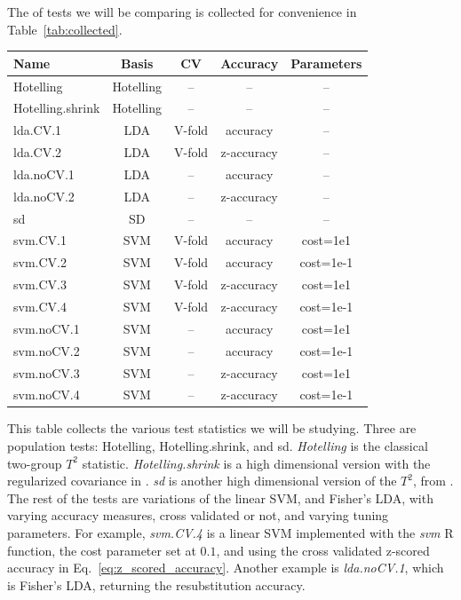 \documentclass[12pt,a4paper]{article}
\theoremstyle{definition}
\newcommand{\R}{\textsf{R }}
\begin{document}
The of tests we will be comparing is collected for convenience in Table~\ref{tab:collected}.
\begin{tcolorbox}
\centering
\begin{tabular}{l|c|c|c|c}
Name & Basis & CV & Accuracy & Parameters\\ 
\hline
\hline
Hotelling & Hotelling & -- & -- & -- \\ 
Hotelling.shrink & Hotelling & -- & -- & -- \\ 
lda.CV.1 & LDA & V-fold & accuracy &  -- \\ 
lda.CV.2 & LDA & V-fold & z-accuracy & -- \\ 
lda.noCV.1 & LDA & -- & accuracy &  --\\ 
lda.noCV.2 & LDA & -- & z-accuracy &  --\\ 
sd & SD & -- & -- & -- \\ 
svm.CV.1 & SVM & V-fold & accuracy & cost=1e1 \\ 
svm.CV.2 & SVM & V-fold & accuracy & cost=1e-1 \\ 
svm.CV.3 & SVM & V-fold & z-accuracy & cost=1e1 \\ 
svm.CV.4 & SVM & V-fold & z-accuracy & cost=1e-1 \\ 
svm.noCV.1 & SVM & -- & accuracy & cost=1e1 \\ 
svm.noCV.2 & SVM & -- & accuracy & cost=1e-1 \\ 
svm.noCV.3 & SVM & -- & z-accuracy & cost=1e1 \\ 
svm.noCV.4 & SVM & -- & z-accuracy & cost=1e-1 \\
\end{tabular} 
\captionsetup{type=table}
\caption{\footnotesize
This table collects the various test statistics we will be studying. 
Three are population tests: Hotelling, Hotelling.shrink, and sd.
\textit{Hotelling} is the classical two-group $T^2$ statistic. 
\textit{Hotelling.shrink} is a high dimensional version with the regularized covariance in \cite{schafer_shrinkage_2005}. 
\textit{sd} is another high dimensional version of the $T^2$, from \cite{srivastava_two_2013}. 
The rest of the tests are variations of the linear SVM, and Fisher's LDA, with varying accuracy measures, cross validated or not, and varying tuning parameters. 
For example, \textit{svm.CV.4} is a linear SVM implemented with the \emph{svm} \R function,
the cost parameter set at $0.1$, and using the cross validated z-scored accuracy in Eq.~\ref{eq:z_scored_accuracy}.
Another example is \textit{lda.noCV.1}, which is Fisher's LDA, returning the resubstitution accuracy.}
\label{tab:collected}
\end{tcolorbox}
\end{document}
